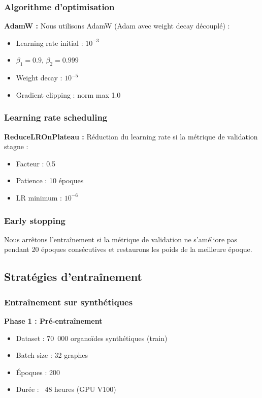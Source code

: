\subsubsection{Algorithme d'optimisation}

\textbf{AdamW :}
Nous utilisons AdamW (Adam avec weight decay découplé) :
\begin{itemize}
    \item Learning rate initial : $10^{-3}$
    \item $\beta_1 = 0.9$, $\beta_2 = 0.999$
    \item Weight decay : $10^{-5}$
    \item Gradient clipping : norm max 1.0
\end{itemize}

\subsubsection{Learning rate scheduling}

\textbf{ReduceLROnPlateau :}
Réduction du learning rate si la métrique de validation stagne :
\begin{itemize}
    \item Facteur : 0.5
    \item Patience : 10 époques
    \item LR minimum : $10^{-6}$
\end{itemize}

\subsubsection{Early stopping}

Nous arrêtons l'entraînement si la métrique de validation ne s'améliore pas pendant 20 époques consécutives et restaurons les poids de la meilleure époque.

\subsection{Stratégies d'entraînement}

\subsubsection{Entraînement sur synthétiques}

\textbf{Phase 1 : Pré-entraînement}
\begin{itemize}
    \item Dataset : 70~000 organoïdes synthétiques (train)
    \item Batch size : 32 graphes
    \item Époques : 200
    \item Durée : ~48 heures (GPU V100)
\end{itemize}

